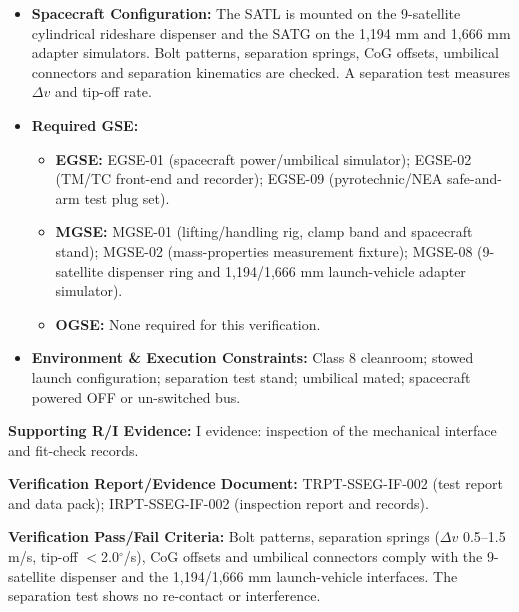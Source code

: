 \begin{itemize}
\item \textbf{Spacecraft Configuration:} The SATL is mounted on the 9-satellite cylindrical rideshare dispenser and the SATG on the 1,194 mm and 1,666 mm adapter simulators. Bolt patterns, separation springs, CoG offsets, umbilical connectors and separation kinematics are checked. A separation test measures $\Delta v$ and tip-off rate.
\item \textbf{Required GSE:}
\begin{itemize}
\item \textbf{EGSE:} EGSE-01 (spacecraft power/umbilical simulator); EGSE-02 (TM/TC front-end and recorder); EGSE-09 (pyrotechnic/NEA safe-and-arm test plug set).
\item \textbf{MGSE:} MGSE-01 (lifting/handling rig, clamp band and spacecraft stand); MGSE-02 (mass-properties measurement fixture); MGSE-08 (9-satellite dispenser ring and 1,194/1,666 mm launch-vehicle adapter simulator).
\item \textbf{OGSE:} None required for this verification.
\end{itemize}
\item \textbf{Environment \& Execution Constraints:} Class 8 cleanroom; stowed launch configuration; separation test stand; umbilical mated; spacecraft powered OFF or un-switched bus.
\end{itemize}
\par\textbf{Supporting R/I Evidence:} I evidence: inspection of the mechanical interface and fit-check records.
\par\textbf{Verification Report/Evidence Document:} TRPT-SSEG-IF-002 (test report and data pack); IRPT-SSEG-IF-002 (inspection report and records).
\par\textbf{Verification Pass/Fail Criteria:} Bolt patterns, separation springs ($\Delta v$ 0.5--1.5 m/s, tip-off $<$2.0$^\circ$/s), CoG offsets and umbilical connectors comply with the 9-satellite dispenser and the 1,194/1,666 mm launch-vehicle interfaces. The separation test shows no re-contact or interference.
\par\medskip

